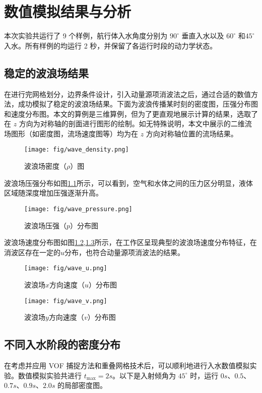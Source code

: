 \chapter{数值模拟结果与分析}
本次实验共运行了 9 个样例，航行体入水角度分别为 $90 ^\circ$ 垂直入水以及 $60 ^\circ$ 和$45 ^\circ$入水。所有样例的均运行 2 秒，并保留了各运行时段的动力学状态。

\section{稳定的波浪场结果}
在进行完网格划分，边界条件设计，引入动量源项消波法之后，通过合适的数值方法，成功模拟了稳定的波浪场结果。下面为波浪传播某时刻的密度图，压强分布图和速度分布图。本文的算例是三维算例，但为了更直观地展示计算的结果，选取了在 $z$ 方向为对称轴的剖面进行图形的绘制。如无特殊说明，本文中展示的二维流场图形（如密度图，流场速度图等）均为在 $z$ 方向对称轴位置的流场结果。

\begin{figure}[!htp]
  \centering
  \texttt{[image: fig/wave\_density.png]}
  \caption{波浪场密度（$\rho$）图}
\end{figure}

波浪场压强分布如图\ref{fig:wave_pressure}所示，可以看到，空气和水体之间的压力区分明显，液体区域随深度增加压强逐渐升高。
\begin{figure}[!htp]
  \centering
  \texttt{[image: fig/wave\_pressure.png]}
  \caption{波浪场压强（$p$）分布图}
  \label{fig:wave_pressure}
\end{figure}

波浪场速度分布图如图\ref{fig:wave_u},\ref{fig:wave_v}所示，在工作区呈现典型的波浪场速度分布特征，在消波区存在一定的$u$分布，也符合动量源项消波法的结果。
\begin{figure}[!htp]
  \centering
  \texttt{[image: fig/wave\_u.png]}
  \caption{波浪场$x$方向速度（$u$）分布图}
  \label{fig:wave_u}
\end{figure}
\begin{figure}[!htp]
  \centering
  \texttt{[image: fig/wave\_v.png]}
  \caption{波浪场$y$方向速度（$v$）分布图}
  \label{fig:wave_v}
\end{figure}

\section{不同入水阶段的密度分布}
在考虑并应用 VOF 捕捉方法和重叠网格技术后，可以顺利地进行入水数值模拟实验。数值模拟实验共进行 $t_{\max} = 2s$。以下是入射倾角为 $45^\circ$ 时，运行 $0s$、$0.5$、$0.7s$、$0.9s$、$2.0s$ 的局部密度图。

